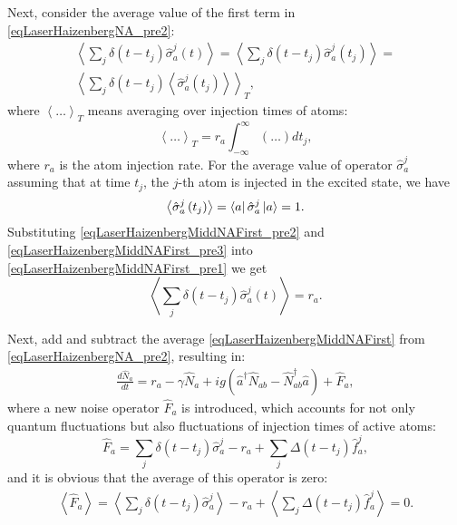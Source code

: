 Next, consider the average value of the first term in \eqref{eqLaserHaizenbergNA_pre2}:
\begin{eqnarray}
\left<\sum_j \delta\left(t -
t_j\right)\hat{\sigma}^{j}_{a}\left(t\right)\right> = 
\left<\sum_j \delta\left(t -
t_j\right)\hat{\sigma}^{j}_{a}\left(t_j\right)\right> =
\nonumber \\
\left<\sum_j \delta\left(t -
t_j\right)\left<\hat{\sigma}^{j}_{a}\left(t_j\right)\right>\right>_T,
\label{eqLaserHaizenbergMiddNAFirst_pre1}
\end{eqnarray}
where $\left<\dots\right>_T$ means averaging over injection times
of atoms:
\begin{equation}
\left<\dots\right>_T =
r_a\int_{-\infty}^{\infty}\left(\dots\right)d t_j,
\label{eqLaserHaizenbergMiddNAFirst_pre2}
\end{equation}
where $r_a$ is the atom injection rate. 
For the average value of operator $\hat{\sigma}^{j}_{a}$
assuming that at time $t_j$, the $j$-th atom is injected in
the excited state, we have
\begin{equation}
\left<\hat{\sigma}^{j}_{a}\left(t_j\right)\right> = 
\bra{a}\hat{\sigma}^{j}_{a}\ket{a} = 1.
\label{eqLaserHaizenbergMiddNAFirst_pre3}
\end{equation}  
Substituting \eqref{eqLaserHaizenbergMiddNAFirst_pre2} and
\eqref{eqLaserHaizenbergMiddNAFirst_pre3} into
\eqref{eqLaserHaizenbergMiddNAFirst_pre1} we get
\begin{equation}
\left<\sum_j \delta\left(t -
t_j\right)\hat{\sigma}^{j}_{a}\left(t\right)\right> = r_a.
\label{eqLaserHaizenbergMiddNAFirst}
\end{equation}

Next, add and subtract the average \eqref{eqLaserHaizenbergMiddNAFirst}
from \eqref{eqLaserHaizenbergNA_pre2}, resulting in:
\begin{eqnarray}
\frac{d \hat{N}_{a}}{d t} 
= r_a  - \gamma
\hat{N}_{a} 
+ i g  \left(
\hat{a}^{\dag}\hat{N}_{ab} -
\hat{N}_{ab}^{\dag}\hat{a}
\right) + \hat{F}_{a},
\label{eqLaserHaizenbergNA}
\end{eqnarray}
where a new noise operator $\hat{F}_{a}$ is introduced, which accounts for not only
quantum fluctuations but also fluctuations of injection times of active atoms:
\begin{equation}
\hat{F}_{a} = \sum_j \delta\left(t - t_j\right)\hat{\sigma}^{j}_{a} -
r_a + \sum_j \Delta\left(t - t_j\right) \hat{f}_{a}^{j}, 
\label{eqLaserHaizenbergFNA}
\end{equation}
and it is obvious that the average of this operator is zero:
\begin{eqnarray}
\left<\hat{F}_{a}\right> = \left<\sum_j \delta\left(t - t_j\right)\hat{\sigma}^{j}_{a}\right> -
r_a + \left<\sum_j \Delta\left(t - t_j\right)
\hat{f}_{a}^{j}\right> = 0. 
\nonumber
\end{eqnarray}

